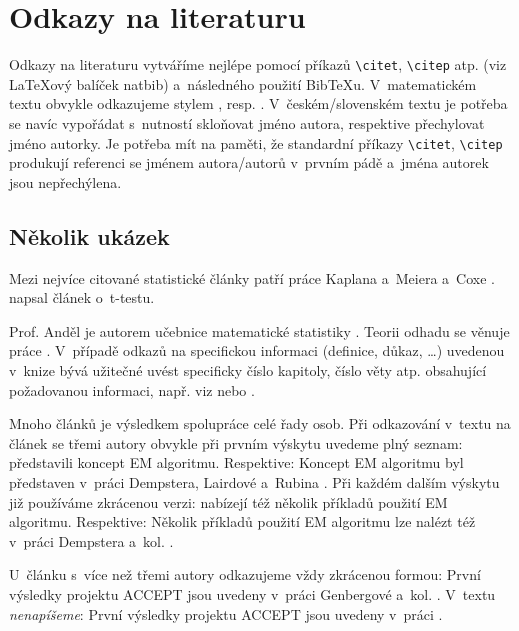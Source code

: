 
\chapter{Odkazy na literaturu}

Odkazy na literaturu vytváříme nejlépe pomocí příkazů
\texttt{{\textbackslash}citet}, \texttt{{\textbackslash}citep} atp.
(viz {\LaTeX}ový balíček \textsf{natbib}) a~následného použití
Bib{\TeX}u. V~matematickém textu obvykle odkazujeme stylem , resp. . V~českém/slovenském textu je potřeba se navíc vypořádat
s~nutností sklo\v{n}ovat jméno autora, respektive přechylovat jméno
autorky. Je potřeba mít na paměti, že standardní příkazy
\texttt{{\textbackslash}citet}, \texttt{{\textbackslash}citep}
produkují referenci se jménem autora/autorů v~prvním pádě a~jména
autorek jsou nepřechýlena.


\section{Několik ukázek}

Mezi nejvíce citované statistické články patří práce Kaplana a~Meiera a~Coxe 
\citep{KaplanMeier58, Cox72}. \citet{Student08} napsal článek o~t-testu. 

Prof. Anděl je autorem učebnice matematické statistiky
\citep[viz][]{Andel98}. Teorii odhadu se věnuje práce
\citet{LehmannCasella98}. V~případě odkazů na specifickou informaci
(definice, důkaz, \dots) uvedenou v~knize bývá užitečné uvést
specificky číslo kapitoly, číslo věty atp. obsahující požadovanou
informaci, např. viz \citet[Věta 4.22]{Andel07} nebo \citep[viz][Věta
4.22]{Andel07}.

Mnoho článků je výsledkem spolupráce celé řady osob. Při odkazování
v~textu na článek se třemi autory obvykle při prvním výskytu uvedeme
plný seznam: \citet*{DempsterLairdRubin77} představili koncept EM
algoritmu. Respektive: Koncept EM algoritmu byl představen v~práci
Dempstera, Lairdové a~Rubina \citep*{DempsterLairdRubin77}. Při každém
dalším výskytu již používáme zkrácenou verzi:
\citet{DempsterLairdRubin77} nabízejí též několik příkladů použití EM
algoritmu. Respektive: Několik příkladů použití EM algoritmu lze
nalézt též v~práci Dempstera a~kol. \citep{DempsterLairdRubin77}.

U~článku s~více než třemi autory odkazujeme vždy zkrácenou formou:
První výsledky projektu ACCEPT jsou uvedeny v~práci Genbergové a~kol.
\citep{Genberget08}. V~textu \emph{nenapíšeme}: První výsledky
projektu ACCEPT jsou uvedeny v~práci \citet*{Genberget08}.
